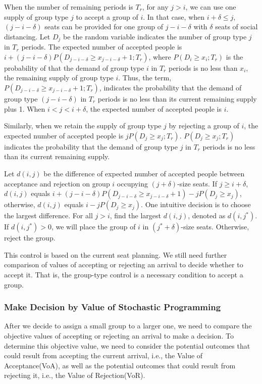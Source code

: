 When the number of remaining periods is $T_r$, for any $j>i$, we can use one supply of group type $j$ to accept a group of $i$. In that case, when $i+\delta \leq j$, $(j-i-\delta)$ seats can be provided for one group of $j-i-\delta$ with $\delta$ seats of social distancing. Let $D_j$ be the random variable indicates the number of group type $j$ in $T_r$ periods. The expected number of accepted people is $i + (j-i-\delta)P(D_{j-i-\delta} \geq x_{j-i-\delta}+1; T_r)$, where $P(D_i \geq x_i; T_r)$ is the probability of that the demand of group type $i$ in $T_r$ periods is no less than $x_i$, the remaining supply of group type $i$. Thus, the term, $P(D_{j-i-\delta} \geq x_{j-i-\delta}+1; T_r)$, indicates the probability that the demand of group type $(j-i-\delta)$ in $T_r$ periods is no less than its current remaining supply plus 1. When $i <j < i+\delta$, the expected number of accepted people is $i$.

Similarly, when we retain the supply of group type $j$ by rejecting a group of $i$, the expected number of accepted people is $j P(D_{j} \geq x_{j}; T_r)$. $P(D_{j} \geq x_{j}; T_r)$ indicates the probability that the demand of group type $j$ in $T_r$ periods is no less than its current remaining supply.

Let $d(i,j)$ be the difference of expected number of accepted people between acceptance and rejection on group $i$ occupying $(j+\delta)$-size seats. If $j \geq i+\delta$, $d(i,j)$ equals $i + (j-i-\delta)P(D_{j-i-\delta} \geq x_{j-i-\delta}+1) - j P(D_{j} \geq x_{j})$, otherwise, $d(i,j)$ equals $i - j P(D_{j} \geq x_{j})$. One intuitive decision is to choose the largest difference. For all $j >i$, find the largest $d(i,j)$, denoted as $d(i,j^{*})$. If $d(i,j^{*}) >0$, we will place the group of $i$ in $(j^{*}+\delta)$-size seats. Otherwise, reject the group.

\begin{remark}
This control is based on the current seat planning. We still need further comparison of values of accepting or rejecting an arrival to decide whether to accept it. That is, the group-type control is a necessary condition to accept a group.
\end{remark}


\subsubsection{Make Decision by Value of Stochastic Programming}
After we decide to assign a small group to a larger one, we need to compare the objective values of accepting or rejecting an arrival to make a decision. To determine this objective value, we need to consider the potential outcomes that could result from accepting the current arrival, i.e., the Value of Acceptance(VoA), as well as the potential outcomes that could result from rejecting it, i.e., the Value of Rejection(VoR).

